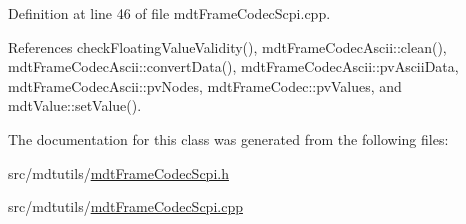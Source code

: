 Definition at line 46 of file mdt\-Frame\-Codec\-Scpi.\-cpp.



References check\-Floating\-Value\-Validity(), mdt\-Frame\-Codec\-Ascii\-::clean(), mdt\-Frame\-Codec\-Ascii\-::convert\-Data(), mdt\-Frame\-Codec\-Ascii\-::pv\-Ascii\-Data, mdt\-Frame\-Codec\-Ascii\-::pv\-Nodes, mdt\-Frame\-Codec\-::pv\-Values, and mdt\-Value\-::set\-Value().



The documentation for this class was generated from the following files\-:\begin{DoxyCompactItemize}
\item 
src/mdtutils/\hyperlink{mdt_frame_codec_scpi_8h}{mdt\-Frame\-Codec\-Scpi.\-h}\item 
src/mdtutils/\hyperlink{mdt_frame_codec_scpi_8cpp}{mdt\-Frame\-Codec\-Scpi.\-cpp}\end{DoxyCompactItemize}
